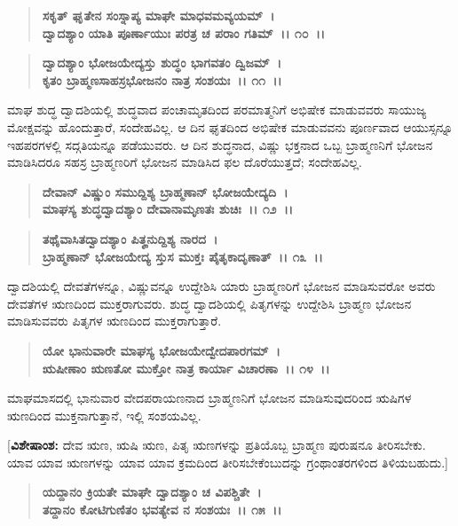 \begin{verse}
\textbf{ಸಕೃತ್ ಘೃತೇನ ಸಂಸ್ನಾಪ್ಯ ಮಾಘೇ ಮಾಧವಮವ್ಯಯಮ್~।}\\\textbf{ದ್ವಾದಶ್ಯಾಂ ಯಾತಿ ಪೂರ್ಣಾಯುಃ ಪರತ್ರ ಚ ಪರಾಂ ಗತಿಮ್~।। ೧೦~।।} 
\end{verse}

\begin{verse}
\textbf{ದ್ವಾದಶ್ಯಾಂ ಭೋಜಯೇದ್ಯಸ್ತು ಶುದ್ಧಂ ಭಾಗವತಂ ದ್ವಿಜಮ್~।}\\\textbf{ಕೃತಂ ಬ್ರಾಹ್ಮಣಸಾಹಸ್ರಭೋಜನಂ ನಾತ್ರ ಸಂಶಯಃ~।। ೧೧~।।}
\end{verse}

ಮಾಘ ಶುದ್ಧ ದ್ವಾದಶಿಯಲ್ಲಿ ಶುದ್ಧವಾದ ಪಂಚಾಮೃತದಿಂದ ಪರಮಾತ್ಮನಿಗೆ ಅಭಿಷೇಕ ಮಾಡುವವರು ಸಾಯುಜ್ಯ ಮೋಕ್ಷವನ್ನು ಹೊಂದುತ್ತಾರೆ, ಸಂದೇಹವಿಲ್ಲ. ಆ ದಿನ ಘೃತದಿಂದ ಅಭಿಷೇಕ ಮಾಡುವವನು ಪೂರ್ಣವಾದ ಆಯುಸ್ಸನ್ನೂ ಇಹಪರಗಳಲ್ಲಿ ಸದ್ಗತಿಯನ್ನೂ ಪಡೆಯುವರು. ಆ ದಿನ ಶುದ್ಧನಾದ, ವಿಷ್ಣು ಭಕ್ತನಾದ ಒಬ್ಬ ಬ್ರಾಹ್ಮಣನಿಗೆ ಭೋಜನ ಮಾಡಿಸಿದರೂ ಸಹಸ್ರ ಬ್ರಾಹ್ಮಣರಿಗೆ ಭೋಜನ ಮಾಡಿಸಿದ ಫಲ ದೊರೆಯುತ್ತದೆ; ಸಂದೇಹವಿಲ್ಲ.

\begin{verse}
\textbf{ದೇವಾನ್ ವಿಷ್ಣುಂ ಸಮುದ್ದಿಶ್ಯ ಬ್ರಾಹ್ಮಣಾನ್ ಭೋಜಯೇದ್ಯದಿ~।}\\\textbf{ಮಾಘಸ್ಯ ಶುದ್ಧದ್ವಾದಶ್ಯಾಂ ದೇವಾನಾಮೃಣತಃ ಶುಚಿಃ~।। ೧೨~।।} 
\end{verse}

\begin{verse}
\textbf{ತಥೈವಾಸಿತದ್ವಾದಶ್ಯಾಂ ಪಿತೄನುದ್ದಿಶ್ಯ ನಾರದ~।}\\\textbf{ಬ್ರಾಹ್ಮಣಾನ್ ಭೋಜಯೇದ್ಯ ಸ್ತುಸ ಮುಕ್ತಃ ಪೈತೃಕಾದೃಣಾತ್~।। ೧೩~।।}
\end{verse}

ದ್ವಾದಶಿಯಲ್ಲಿ ದೇವತೆಗಳನ್ನೂ, ವಿಷ್ಣುವನ್ನೂ ಉದ್ದೇಶಿಸಿ ಯಾರು ಬ್ರಾಹ್ಮಣರಿಗೆ ಭೋಜನ ಮಾಡಿಸುವರೋ ಅವರು ದೇವತೆಗಳ ಋಣದಿಂದ ಮುಕ್ತರಾಗುವರು. ಶುದ್ಧ ದ್ವಾದಶಿಯಲ್ಲಿ ಪಿತೃಗಳನ್ನು ಉದ್ದೇಶಿಸಿ ಬ್ರಾಹ್ಮಣ ಭೋಜನ ಮಾಡಿಸುವವರು ಪಿತೃಗಳ ಋಣದಿಂದ ಮುಕ್ತ\-ರಾಗುತ್ತಾರೆ.

\begin{verse}
\textbf{ಯೋ ಭಾನುವಾರೇ ಮಾಘಸ್ಯ ಭೋಜಯೇದ್ವೇದಪಾರಗಮ್~।}\\\textbf{ಋಷೀಣಾಂ ಋಣತೋ ಮುಕ್ತೋ ನಾತ್ರ ಕಾರ್ಯಾ ವಿಚಾರಣಾ~।। ೧೪~।।}
\end{verse}

ಮಾಘಮಾಸದಲ್ಲಿ ಭಾನುವಾರ ವೇದಪರಾಯಣನಾದ ಬ್ರಾಹ್ಮಣನಿಗೆ ಭೋಜನ ಮಾಡಿಸುವುದರಿಂದ ಋಷಿಗಳ ಋಣದಿಂದ ಮುಕ್ತನಾಗುತ್ತಾನೆ, ಇಲ್ಲಿ ಸಂಶಯವಿಲ್ಲ.

[\textbf{ವಿಶೇಷಾಂಶ:} ದೇವ ಋಣ, ಋಷಿ ಋಣ, ಪಿತೃ ಋಣಗಳನ್ನು ಪ್ರತಿಯೊಬ್ಬ ಬ್ರಾಹ್ಮಣ ಪುರುಷನೂ ತೀರಿಸಬೇಕು. ಯಾವ ಯಾವ ಋಣಗಳನ್ನು ಯಾವ ಯಾವ ಕ್ರಮದಿಂದ ತೀರಿಸಬೇಕೆಂಬುದನ್ನು ಗ್ರಂಥಾಂತರಗಳಿಂದ ತಿಳಿಯಬಹುದು.]

\begin{verse}
\textbf{ಯದ್ದಾನಂ ಕ್ರಿಯತೇ ಮಾಘೇ ದ್ವಾದಶ್ಯಾಂ ಚ ವಿಪಶ್ಚಿತೇ~।}\\\textbf{ತದ್ದಾನಂ ಕೋಟಿಗುಣಿತಂ ಭವತ್ಯೇವ ನ ಸಂಶಯಃ~।। ೧೫~।।}
\end{verse}

